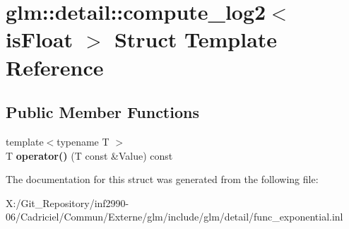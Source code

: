 \hypertarget{structglm_1_1detail_1_1compute__log2}{\section{glm\-:\-:detail\-:\-:compute\-\_\-log2$<$ is\-Float $>$ Struct Template Reference}
\label{structglm_1_1detail_1_1compute__log2}
}
\subsection*{Public Member Functions}
\begin{DoxyCompactItemize}
\item 
\hypertarget{structglm_1_1detail_1_1compute__log2_a89ee0d494b7df86090055438a30bff32}{{\footnotesize template$<$typename T $>$ }\\T {\bfseries operator()} (T const \&Value) const }\label{structglm_1_1detail_1_1compute__log2_a89ee0d494b7df86090055438a30bff32}

\end{DoxyCompactItemize}


The documentation for this struct was generated from the following file\-:\begin{DoxyCompactItemize}
\item 
X\-:/\-Git\-\_\-\-Repository/inf2990-\/06/\-Cadriciel/\-Commun/\-Externe/glm/include/glm/detail/func\-\_\-exponential.\-inl\end{DoxyCompactItemize}
